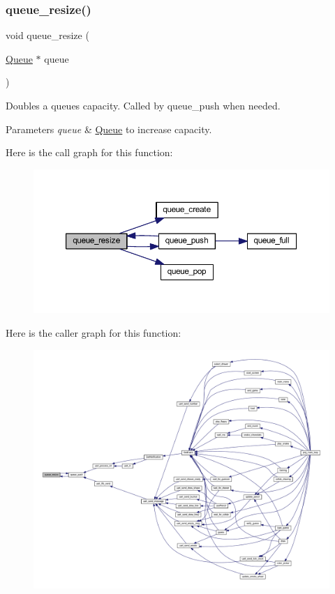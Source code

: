 \subsubsection{\texorpdfstring{queue\+\_\+resize()}{queue\_resize()}}
{\footnotesize\ttfamily void queue\+\_\+resize (\begin{DoxyParamCaption}\item[{\mbox{\hyperlink{struct_queue}{Queue}} $\ast$}]{queue }\end{DoxyParamCaption})}



Doubles a queue\textquotesingle{}s capacity. Called by queue\+\_\+push when needed. 


\begin{DoxyParams}{Parameters}
{\em queue} & \mbox{\hyperlink{struct_queue}{Queue}} to increase capacity. \\
\hline
\end{DoxyParams}
Here is the call graph for this function\+:\nopagebreak
\begin{figure}[H]
\begin{center}
\leavevmode
\includegraphics[width=350pt]{group__queue_ga017ba4cb33cd9d231b0071fa8d9190cc_cgraph}
\end{center}
\end{figure}
Here is the caller graph for this function\+:\nopagebreak
\begin{figure}[H]
\begin{center}
\leavevmode
\includegraphics[width=350pt]{group__queue_ga017ba4cb33cd9d231b0071fa8d9190cc_icgraph}
\end{center}
\end{figure}


